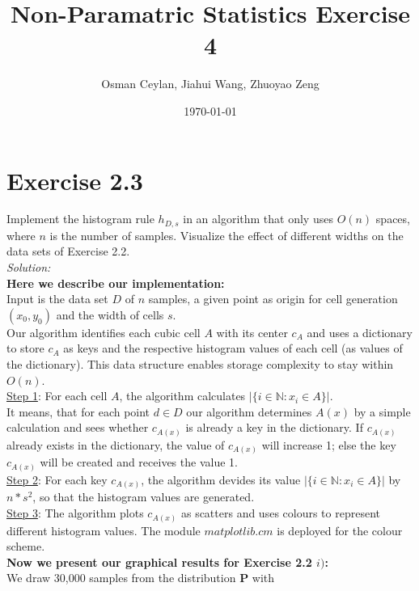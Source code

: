\documentclass{article}
\title{Non-Paramatric Statistics Exercise 4}
\author{Osman Ceylan, Jiahui Wang, Zhuoyao Zeng}
\date{\today}
\begin{document}
\maketitle

\section*{Exercise 2.3} \vspace*{-1em}
Implement the histogram rule $h_{D,s}$ in an algorithm that only uses $O(n)$ spaces, where $n$ is the number of samples. Visualize the effect of different widths on the data sets of Exercise 2.2.\\
\textit{Solution: }\\
\textbf{Here we describe our implementation:}\\
Input is the data set $D$ of $n$ samples, a given point as origin for cell generation $(x_0,y_0)$ and the width of cells $s$.\\
Our algorithm identifies each cubic cell $A$ with its center $c_A$ and uses a dictionary to store $c_A$ as keys and the respective histogram values of each cell (as values of the dictionary). This data structure enables storage complexity to stay within $O(n)$.\\
\underline{Step 1}: For each cell $A$, the algorithm calculates $|\{ i\in \mathbb{N} : x_i\in A\}|$. \\
It means, that for each point $d \in D$ our algorithm determines $A(x)$ by a simple calculation and sees whether $c_{A(x)}$ is already a key in the dictionary. If $c_{A(x)}$ already exists in the dictionary, the value of $c_{A(x)}$ will increase 1; else the key $c_{A(x)}$ will be created and receives the value 1.\\
\underline{Step 2}: For each key $c_{A(x)}$, the algorithm devides its value $|\{ i\in \mathbb{N} : x_i\in A\}|$ by $n * s^2$, so that the histogram values are generated. \\
\underline{Step 3}: The algorithm plots $c_{A(x)}$ as scatters and uses colours to represent different histogram values. The module $matplotlib.cm$ is deployed for the colour scheme. \\
\textbf{Now we present our graphical results for Exercise 2.2 $i)$:} \\
We draw 30,000 samples from the distribution $\mathbf{P}$ with \\
\end{document}
